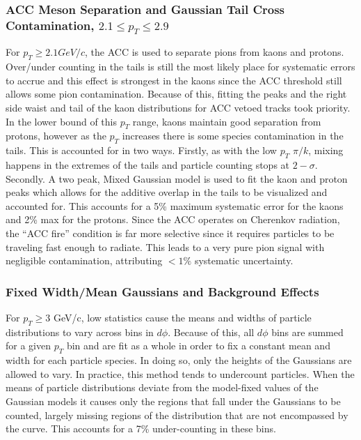 \subsubsection{ACC Meson Separation and Gaussian Tail Cross Contamination, $2.1\leq p_T \leq 2.9$}
For $p_T \geq 2.1 GeV/c$, the ACC is used to separate pions from kaons and protons. Over/under counting in the tails is still the most likely place for systematic errors to accrue and this effect is strongest in the kaons since the ACC threshold still allows some pion contamination. Because of this, fitting the peaks and the right side waist and tail of the kaon distributions for ACC vetoed tracks took priority. In the lower bound of this $p_T$ range, kaons maintain good separation from protons, however as the $p_T$ increases there is some species contamination in the tails. This is accounted for in two ways. Firstly, as with the low $p_T$ $\pi / k$, mixing happens in the extremes of the tails and particle counting stops at $2-\sigma$. Secondly. A two peak, Mixed Gaussian model is used to fit the kaon and proton peaks which allows for the additive overlap in the tails to be visualized and accounted for. This accounts for a 5\% maximum systematic error for the kaons and 2\% max for the protons. Since the ACC operates on Cherenkov radiation, the ``ACC fire'' condition is far more selective since it requires particles to be traveling fast enough to radiate. This leads to a very pure pion signal with negligible contamination, attributing $<1\%$ systematic uncertainty.

\subsubsection{Fixed Width/Mean Gaussians and Background Effects}
For $p_T \geq 3$ GeV/c, low statistics cause the means and widths of particle distributions to vary across bins in $d\phi$. Because of this, all $d\phi$ bins are summed for a given $p_T$ bin and are fit as a whole in order to fix a constant mean and width for each particle species. In doing so, only the heights of the Gaussians are allowed to vary. In practice, this method tends to undercount particles. When the means of particle distributions deviate from the model-fixed values of the Gaussian models it causes only the regions that fall under the Gaussians to be counted, largely missing regions of the distribution that are not encompassed by the curve. This accounts for a 7\% under-counting in these bins.

